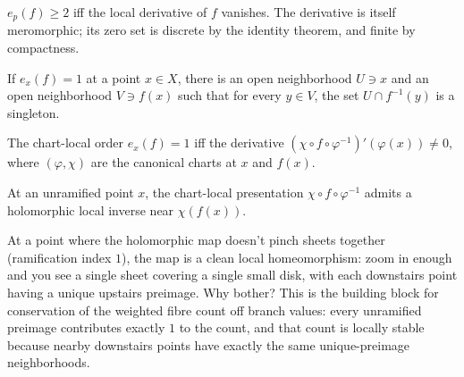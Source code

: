 \begin{proofsketch}
\(e_p(f)\ge 2\) iff the local derivative of \(f\) vanishes. The
derivative is itself meromorphic; its zero set is discrete by the
identity theorem, and finite by compactness.
\end{proofsketch}

\begin{lemma}
\label{lem:local-inj-unramified}
If \(e_x(f)=1\) at a point \(x\in X\), there is an open neighborhood
\(U\ni x\) and an open neighborhood \(V\ni f(x)\) such that for every
\(y\in V\), the set \(U\cap f^{-1}(y)\) is a singleton.
\leanok
\end{lemma}

\begin{lemma}
\label{lem:order-eq-one-iff-deriv-ne-zero}
The chart-local order \(e_x(f)=1\) iff the derivative
\((\chi\circ f\circ\varphi^{-1})'(\varphi(x))\ne 0\), where
\((\varphi,\chi)\) are the canonical charts at \(x\) and \(f(x)\).
\leanok
\end{lemma}

\begin{lemma}
\label{lem:chart-local-inverse-unramified}
At an unramified point \(x\), the chart-local presentation
\(\chi\circ f\circ\varphi^{-1}\) admits a holomorphic local inverse
near \(\chi(f(x))\).
\leanok
\end{lemma}

\begin{layman}
At a point where the holomorphic map doesn't pinch sheets together
(ramification index \(1\)), the map is a clean local
homeomorphism: zoom in enough and you see a single sheet covering a
single small disk, with each downstairs point having a unique upstairs
preimage. Why bother? This is the building block for conservation of
the weighted fibre count off branch values: every unramified preimage
contributes exactly \(1\) to the count, and that count is locally
stable because nearby downstairs points have exactly the same
unique-preimage neighborhoods.
\end{layman}


